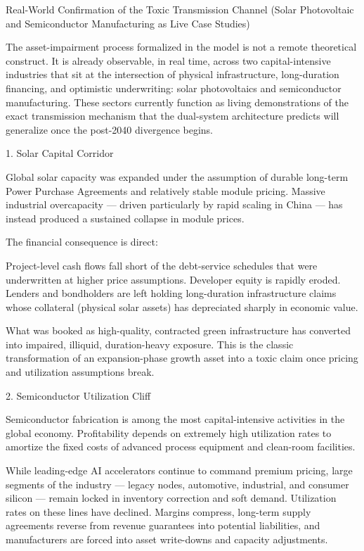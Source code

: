 Real-World Confirmation of the Toxic Transmission Channel  
(Solar Photovoltaic and Semiconductor Manufacturing as Live Case Studies)

The asset-impairment process formalized in the model is not a remote theoretical construct. It is already observable, in real time, across two capital-intensive industries that sit at the intersection of physical infrastructure, long-duration financing, and optimistic underwriting: solar photovoltaics and semiconductor manufacturing. These sectors currently function as living demonstrations of the exact transmission mechanism that the dual-system architecture predicts will generalize once the post-2040 divergence begins.

1. Solar Capital Corridor

Global solar capacity was expanded under the assumption of durable long-term Power Purchase Agreements and relatively stable module pricing. Massive industrial overcapacity — driven particularly by rapid scaling in China — has instead produced a sustained collapse in module prices.  

The financial consequence is direct:

Project-level cash flows fall short of the debt-service schedules that were underwritten at higher price assumptions.  
Developer equity is rapidly eroded.  
Lenders and bondholders are left holding long-duration infrastructure claims whose collateral (physical solar assets) has depreciated sharply in economic value.  

What was booked as high-quality, contracted green infrastructure has converted into impaired, illiquid, duration-heavy exposure. This is the classic transformation of an expansion-phase growth asset into a toxic claim once pricing and utilization assumptions break.

2. Semiconductor Utilization Cliff

Semiconductor fabrication is among the most capital-intensive activities in the global economy. Profitability depends on extremely high utilization rates to amortize the fixed costs of advanced process equipment and clean-room facilities.  

While leading-edge AI accelerators continue to command premium pricing, large segments of the industry — legacy nodes, automotive, industrial, and consumer silicon — remain locked in inventory correction and soft demand. Utilization rates on these lines have declined. Margins compress, long-term supply agreements reverse from revenue guarantees into potential liabilities, and manufacturers are forced into asset write-downs and capacity adjustments.  

